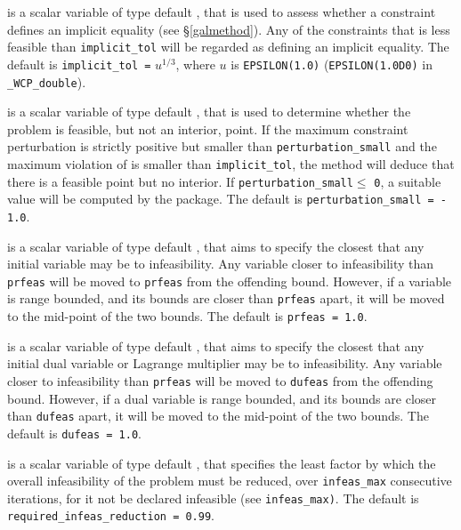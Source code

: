 \documentclass{galahad}
\newcommand{\packagename}{WCP}
\newcommand{\fullpackagename}{\libraryname\_\-\packagename}
\begin{document}
\begin{description}
 is a scalar variable of type default \realdp, 
that is used to assess whether a constraint defines an implicit equality
(see \S\ref{galmethod}). Any of the constraints 
that is less feasible than {\tt implicit\_tol} will be regarded as defining 
an implicit equality.
The default is {\tt implicit\_tol =} $u^{1/3}$,
where $u$ is {\tt EPSILON(1.0)} ({\tt EPSILON(1.0D0)} in 
{\tt \fullpackagename\_double}).

 is a scalar variable of type default \realdp, 
that is used to determine whether the problem is feasible, but not
an interior, point. If the maximum constraint perturbation is strictly 
positive but smaller than {\tt perturbation\_small} and the maximum violation 
of  is smaller than {\tt implicit\_tol}, the 
method will deduce that there is a feasible point but no interior.
If {\tt perturbation\_sm\-all}$\leq$ {\tt 0}, a suitable value will be
computed by the package. The default is {\tt perturbation\_sm\-all = - 1.0}.

 is a scalar variable of type default \realdp, that aims to specify
the closest that any initial variable may be to infeasibility. Any variable
closer to infeasibility than {\tt prfeas} will be moved to {\tt prfeas} from 
the offending bound. However, if a variable is range bounded, and its bounds 
are closer than {\tt prfeas} apart, it will be moved to the mid-point of the 
two bounds.
The default is {\tt prfeas = 1.0}.

 is a scalar variable of type default \realdp, that aims to specify
the closest that any initial dual variable or Lagrange multiplier may be to 
infeasibility. Any variable closer to infeasibility than {\tt prfeas} will be
moved to {\tt dufeas} from the offending bound. However, if a dual variable
is range bounded, and its bounds are closer than {\tt dufeas} apart, it will
be moved to the mid-point of the two bounds.
The default is {\tt dufeas = 1.0}.

  is a scalar variable of type default 
\realdp, that specifies the
least factor by which the overall infeasibility of the problem must be reduced,
over {\tt infeas\_max} consecutive iterations, 
for it not be declared infeasible (see {\tt infeas\_max)}.
The default is {\tt required\_infeas\_re\-duction = 0.99}.



\end{description}
\end{document}

